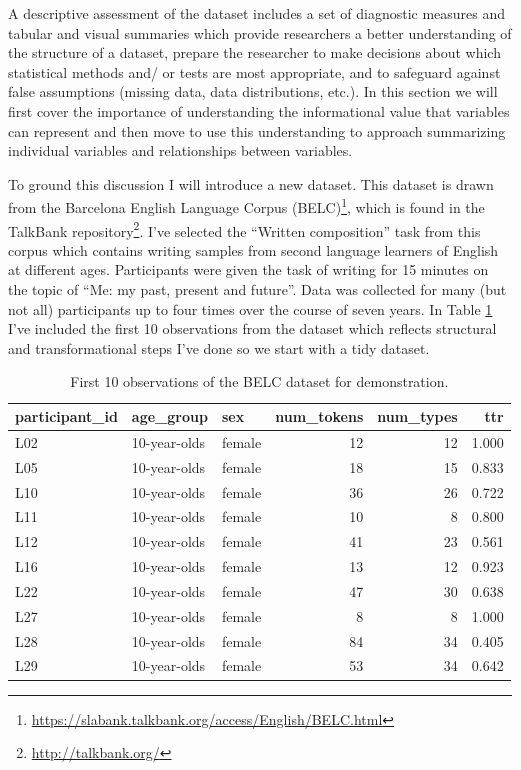 \documentclass[
]{article}
\DeclareRobustCommand{\href}[2]{#2\footnote{\url{#1}}}
\begin{document}
A descriptive assessment of the dataset includes a set of diagnostic measures and tabular and visual summaries which provide researchers a better understanding of the structure of a dataset, prepare the researcher to make decisions about which statistical methods and/ or tests are most appropriate, and to safeguard against false assumptions (missing data, data distributions, etc.). In this section we will first cover the importance of understanding the informational value that variables can represent and then move to use this understanding to approach summarizing individual variables and relationships between variables.

To ground this discussion I will introduce a new dataset. This dataset is drawn from the \href{https://slabank.talkbank.org/access/English/BELC.html}{Barcelona English Language Corpus (BELC)}, which is found in the \href{http://talkbank.org/}{TalkBank repository}. I've selected the ``Written composition'' task from this corpus which contains writing samples from second language learners of English at different ages. Participants were given the task of writing for 15 minutes on the topic of ``Me: my past, present and future''. Data was collected for many (but not all) participants up to four times over the course of seven years. In Table \ref{tab:belc-overview} I've included the first 10 observations from the dataset which reflects structural and transformational steps I've done so we start with a tidy dataset.

\begin{table}

\caption{\label{tab:belc-overview}First 10 observations of the BELC dataset for demonstration.}
\centering
\begin{tabular}[t]{lllrrr}
\toprule
participant\_id & age\_group & sex & num\_tokens & num\_types & ttr\\
\midrule
L02 & 10-year-olds & female & 12 & 12 & 1.000\\
L05 & 10-year-olds & female & 18 & 15 & 0.833\\
L10 & 10-year-olds & female & 36 & 26 & 0.722\\
L11 & 10-year-olds & female & 10 & 8 & 0.800\\
L12 & 10-year-olds & female & 41 & 23 & 0.561\\
\addlinespace
L16 & 10-year-olds & female & 13 & 12 & 0.923\\
L22 & 10-year-olds & female & 47 & 30 & 0.638\\
L27 & 10-year-olds & female & 8 & 8 & 1.000\\
L28 & 10-year-olds & female & 84 & 34 & 0.405\\
L29 & 10-year-olds & female & 53 & 34 & 0.642\\
\bottomrule
\end{tabular}
\end{table}
\end{document}
